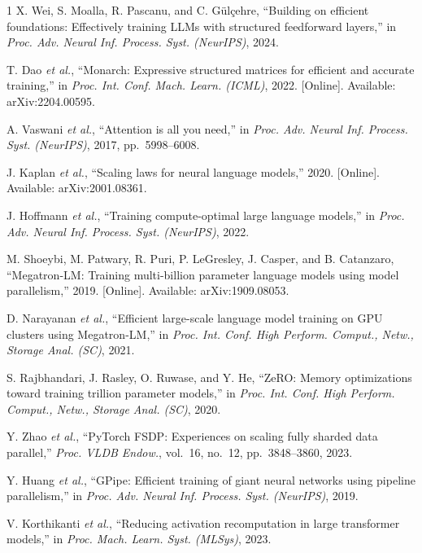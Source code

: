 \documentclass[10pt,journal]{IEEEtran}
\begin{document}
\begin{thebibliography}{1}
X. Wei, S. Moalla, R. Pascanu, and C. Gülçehre, ``Building on efficient foundations: Effectively
training LLMs with structured feedforward layers,'' in \emph{Proc. Adv. Neural Inf. Process.
Syst. (NeurIPS)}, 2024.

T. Dao \emph{et al.}, ``Monarch: Expressive structured matrices for efficient and accurate
training,'' in \emph{Proc. Int. Conf. Mach. Learn. (ICML)}, 2022. [Online]. Available:
arXiv:2204.00595.

A. Vaswani \emph{et al.}, ``Attention is all you need,'' in \emph{Proc. Adv. Neural Inf.
Process. Syst. (NeurIPS)}, 2017, pp.~5998--6008.

J. Kaplan \emph{et al.}, ``Scaling laws for neural language models,'' 2020. [Online].
Available: arXiv:2001.08361.

J. Hoffmann \emph{et al.}, ``Training compute-optimal large language models,'' in
\emph{Proc. Adv. Neural Inf. Process. Syst. (NeurIPS)}, 2022.

M. Shoeybi, M. Patwary, R. Puri, P. LeGresley, J. Casper, and B. Catanzaro, ``Megatron-LM:
Training multi-billion parameter language models using model parallelism,'' 2019. [Online].
Available: arXiv:1909.08053.

D. Narayanan \emph{et al.}, ``Efficient large-scale language model training on GPU clusters
using Megatron-LM,'' in \emph{Proc. Int. Conf. High Perform. Comput., Netw., Storage Anal.
(SC)}, 2021.

S. Rajbhandari, J. Rasley, O. Ruwase, and Y. He, ``ZeRO: Memory optimizations toward training
trillion parameter models,'' in \emph{Proc. Int. Conf. High Perform. Comput., Netw., Storage
Anal. (SC)}, 2020.

Y. Zhao \emph{et al.}, ``PyTorch FSDP: Experiences on scaling fully sharded data parallel,''
\emph{Proc. VLDB Endow.}, vol.~16, no.~12, pp.~3848--3860, 2023.

Y. Huang \emph{et al.}, ``GPipe: Efficient training of giant neural networks using pipeline
parallelism,'' in \emph{Proc. Adv. Neural Inf. Process. Syst. (NeurIPS)}, 2019.

V. Korthikanti \emph{et al.}, ``Reducing activation recomputation in large transformer
models,'' in \emph{Proc. Mach. Learn. Syst. (MLSys)}, 2023.


\end{thebibliography}
\end{document}
